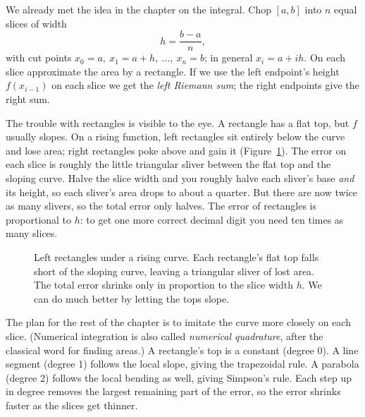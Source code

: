 We already met the idea in the chapter on the integral. Chop $[a,b]$ into $n$ equal slices of width
\[
h = \frac{b-a}{n},
\]
with cut points $x_0 = a,\ x_1 = a+h,\ \dots,\ x_n = b$; in general $x_i = a + ih$. On each slice approximate the area by a rectangle. If we use the left endpoint's height $f(x_{i-1})$ on each slice we get the \emph{left Riemann sum}; the right endpoints give the right sum.

The trouble with rectangles is visible to the eye. A rectangle has a flat top, but $f$ usually slopes. On a rising function, left rectangles sit entirely below the curve and lose area; right rectangles poke above and gain it (Figure~\ref{ch27:fig-rect}). The error on each slice is roughly the little triangular sliver between the flat top and the sloping curve. Halve the slice width and you roughly halve each sliver's base \emph{and} its height, so each sliver's area drops to about a quarter. But there are now twice as many slivers, so the total error only halves. The error of rectangles is proportional to $h$: to get one more correct decimal digit you need ten times as many slices.

\begin{figure}[htbp]
\centering
{}
\caption{Left rectangles under a rising curve. Each rectangle's flat top falls short of the sloping curve, leaving a triangular sliver of lost area. The total error shrinks only in proportion to the slice width $h$. We can do much better by letting the tops slope.}
\label{ch27:fig-rect}
\end{figure}

\begin{intuitionbox}
The plan for the rest of the chapter is to imitate the curve more closely on each slice. (Numerical integration is also called \emph{numerical quadrature}, after the classical word for finding areas.) A rectangle's top is a constant (degree 0). A line segment (degree 1) follows the local slope, giving the trapezoidal rule. A parabola (degree 2) follows the local bending as well, giving Simpson's rule. Each step up in degree removes the largest remaining part of the error, so the error shrinks faster as the slices get thinner.
\end{intuitionbox}

